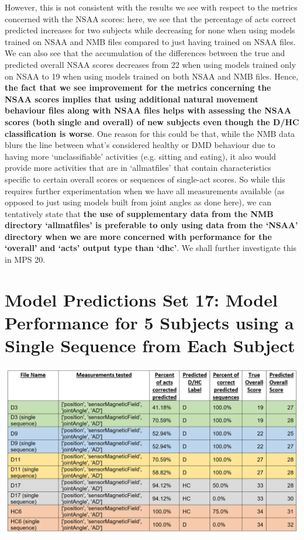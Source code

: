\documentclass[12pt,twoside]{report}
\begin{document}
\quad However, this is not consistent with the results we see with respect to the metrics concerned with the NSAA scores: here, we see that the percentage of acts correct predicted increases for two subjects while decreasing for none when using models trained on NSAA and NMB files compared to just having trained on NSAA files. We can also see that the accumulation of the differences between the true and predicted overall NSAA scores decreases from 22 when using models trained only on NSAA to 19 when using models trained on both NSAA and NMB files. Hence, \textbf{the fact that we see improvement for the metrics concerning the NSAA scores implies that using additional natural movement behaviour files along with NSAA files helps with assessing the NSAA scores (both single and overall) of new subjects even though the D/HC classification is worse}. One reason for this could be that, while the NMB data blurs the line between what’s considered healthy or DMD behaviour due to having more ‘unclassifiable’ activities (e.g. sitting and eating), it also would provide more activities that are in ‘allmatfiles’ that contain characteristics specific to certain overall scores or sequences of single-act scores. So while this requires further experimentation when we have all measurements available (as opposed to just using models built from joint angles as done here), we can tentatively state that \textbf{the use of supplementary data from the NMB directory ‘allmatfiles’ is preferable to only using data from the ‘NSAA’ directory when we are more concerned with performance for the ‘overall’ and ‘acts’ output type than ‘dhc’}. We shall further investigate this in MPS 20.




\section{Model Predictions Set 17: Model Performance for 5 Subjects using a Single Sequence from Each Subject}

\begin{center}
\includegraphics[scale=0.4]{project_figures/fig11_24}
\end{center}
\end{document}
